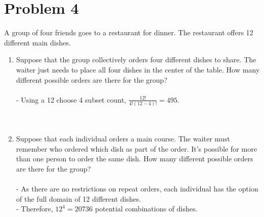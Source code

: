 \documentclass{amsart}
\theoremstyle{definition}
\theoremstyle{Exercise}
\theoremstyle{remark}
\theoremstyle{rule}
\numberwithin{equation}{section}
\begin{document}
\section*{Problem 4}
A group of four friends goes to a restaurant for dinner. The restaurant offers 12 different main dishes.\\
    \begin{enumerate}[label=(\roman*)]
    \item Suppose that the group collectively orders four different dishes to share. The waiter just needs to place all four dishes in the center of the table. How many different possible orders are there for the group?\\\\
  - Using a 12 choose 4 subset count, $\frac{12!}{4!(12-4)!}=495$.\\
  \\\\
    \item Suppose that each individual orders a main course. The waiter must remember who ordered which dish as part of the order. It's possible for more than one person to order the same dish. How many different possible orders are there for the group?\\\\
  - As there are no restrictions on repeat orders, each individual has the option of the full domain of 12 different dishes.\\
  - Therefore, $12^4 = 20736$ potential combinations of dishes.
\\\\

    \end{enumerate}
\end{document}
